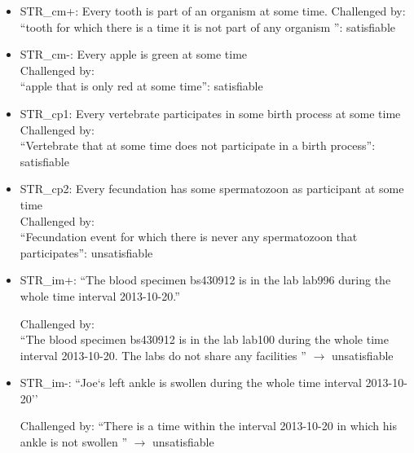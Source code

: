 \begin{itemize}
\item STR\_cm+: Every tooth is part of an organism at some time. Challenged by: 
\\ ``tooth for which there is a time it is not part of any organism '': satisfiable \\


\item STR\_cm-: Every apple is green at some time
\\
Challenged by: 
\\
``apple that is only red at some time'': satisfiable 


\item STR\_cp1: Every vertebrate participates in some birth process at some time\\
Challenged by: \\  
``Vertebrate that at some time does not participate in a birth process'': satisfiable 



\item STR\_cp2: Every fecundation has some spermatozoon as participant at some time
\\
Challenged by: \\ 
``Fecundation event for which there is never any spermatozoon that participates'': unsatisfiable \\




\item STR\_im+: ``The blood specimen bs430912 is in the lab lab996 during the whole time interval 2013-10-20.'' 


Challenged by: \\ ``The blood specimen bs430912 is in the lab lab100 during the whole time interval 2013-10-20. The labs do not share any facilities
'' $\rightarrow$ unsatisfiable



\item STR\_im-: ``Joe`s left ankle is swollen during the whole time interval 2013-10-20''


Challenged by: 
``There is a time within the interval 2013-10-20 in which his ankle is not swollen '' $\rightarrow$ unsatisfiable




\end{itemize}
